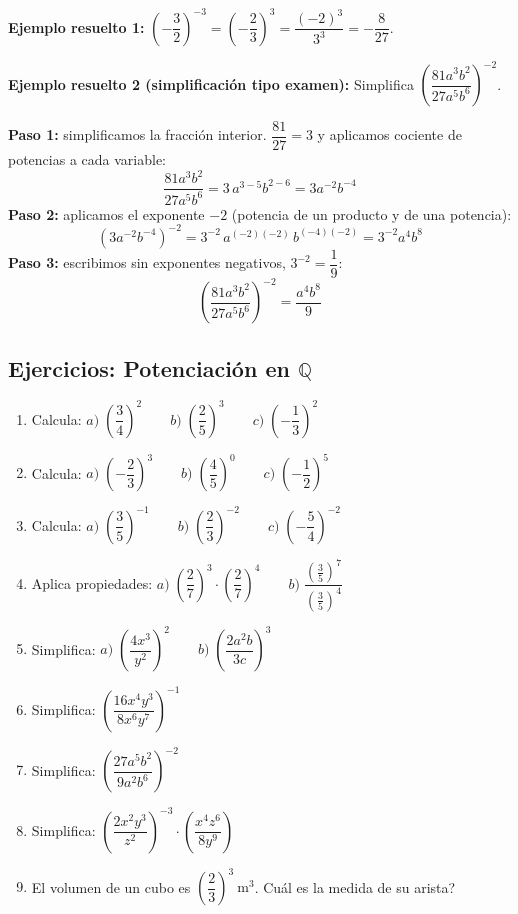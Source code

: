 \documentclass[12pt, letterpaper]{article}
\newcommand{\Q}{\mathbb{Q}}
\begin{document}
\noindent\textbf{Ejemplo resuelto 1:} $\left(-\dfrac{3}{2}\right)^{-3} = \left(-\dfrac{2}{3}\right)^3 = \dfrac{(-2)^3}{3^3} = -\dfrac{8}{27}$.

\noindent\textbf{Ejemplo resuelto 2 (simplificación tipo examen):} Simplifica $\left(\dfrac{81a^3b^2}{27a^5b^6}\right)^{-2}$.

\begin{cuadrosolucion}
  \textbf{Paso 1:} simplificamos la fracción interior. $\dfrac{81}{27} = 3$ y aplicamos cociente de potencias a cada variable:
  \[
    \frac{81a^3b^2}{27a^5b^6} = 3\,a^{3-5}b^{2-6} = 3a^{-2}b^{-4}
  \]
  \textbf{Paso 2:} aplicamos el exponente $-2$ (potencia de un producto y de una potencia):
  \[
    \left(3a^{-2}b^{-4}\right)^{-2} = 3^{-2}\,a^{(-2)(-2)}\,b^{(-4)(-2)} = 3^{-2}a^{4}b^{8}
  \]
  \textbf{Paso 3:} escribimos sin exponentes negativos, $3^{-2} = \dfrac{1}{9}$:
  \[
    \boxed{\ \left(\frac{81a^3b^2}{27a^5b^6}\right)^{-2} = \frac{a^{4}b^{8}}{9}\ }
  \]
\end{cuadrosolucion}

\subsection{Ejercicios: Potenciación en $\Q$}

\begin{enumerate}[leftmargin=*]
  \item \facil{} Calcula: $a)\; \left(\dfrac{3}{4}\right)^2 \qquad b)\; \left(\dfrac{2}{5}\right)^3 \qquad c)\; \left(-\dfrac{1}{3}\right)^2$

  \item \facil{} Calcula: $a)\; \left(-\dfrac{2}{3}\right)^3 \qquad b)\; \left(\dfrac{4}{5}\right)^0 \qquad c)\; \left(-\dfrac{1}{2}\right)^5$

  \item \facil{} Calcula: $a)\; \left(\dfrac{3}{5}\right)^{-1} \qquad b)\; \left(\dfrac{2}{3}\right)^{-2} \qquad c)\; \left(-\dfrac{5}{4}\right)^{-2}$

  \item \medio{} Aplica propiedades: $a)\; \left(\dfrac{2}{7}\right)^3 \cdot \left(\dfrac{2}{7}\right)^4 \qquad b)\; \dfrac{\left(\frac{3}{5}\right)^7}{\left(\frac{3}{5}\right)^4}$

  \item \medio{} Simplifica: $a)\; \left(\dfrac{4x^3}{y^2}\right)^2 \qquad b)\; \left(\dfrac{2a^2b}{3c}\right)^3$

  \item \medio{} Simplifica: $\left(\dfrac{16x^4y^3}{8x^6y^7}\right)^{-1}$

  \item \medio{} Simplifica: $\left(\dfrac{27a^5b^2}{9a^2b^6}\right)^{-2}$

  \item \dificil{} Simplifica: $\left(\dfrac{2x^2y^3}{z^2}\right)^{-3} \cdot \left(\dfrac{x^4z^6}{8y^9}\right)$

  \item \dificil{} El volumen de un cubo es $\left(\dfrac{2}{3}\right)^3\ \text{m}^3$. \textquestiondown Cuál es la medida de su arista?
\end{enumerate}
\end{document}
